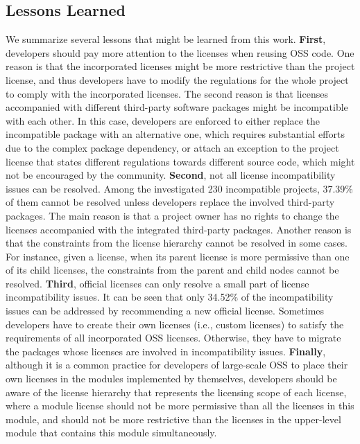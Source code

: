 \subsection{Lessons Learned}
We summarize several lessons that might be learned from this work. \textbf{First}, developers should pay more attention to the licenses when reusing OSS code. One reason is that the incorporated licenses might be more restrictive than the project license, and thus developers have to modify the regulations for the whole project to comply with the incorporated licenses. The second reason is that licenses accompanied with different third-party software packages might be incompatible with each other. In this case, developers are enforced to either replace the incompatible package with an alternative one, which requires substantial efforts due to the complex package dependency, or attach an exception to the project license that states different regulations towards different source code, which might not be encouraged by the community.
%
\textbf{Second}, not all license incompatibility issues can be resolved. Among the investigated 230 incompatible projects, {37.39\%} of them cannot be resolved unless developers replace the involved third-party packages. The main reason is that a project owner has no rights to change the licenses accompanied with the integrated third-party packages. Another reason is that the constraints from the license hierarchy cannot be resolved in some cases. For instance, given a license, when its parent license is more permissive than one of its child licenses, the constraints from the parent and child nodes cannot be resolved.
%
\textbf{Third}, official licenses can only resolve a small part of license incompatibility issues. It can be seen that only {34.52\%} of the incompatibility issues can be addressed by recommending a new official license. Sometimes developers have to create their own licenses (i.e., custom licenses) to satisfy the requirements of all incorporated OSS licenses. Otherwise, they have to migrate the packages whose licenses are involved in incompatibility issues.
%
\textbf{Finally}, although it is a common practice for developers of large-scale OSS to place their own licenses in the modules implemented by themselves, developers should be aware of the license hierarchy that represents the licensing scope of each license, where a module license should not be more permissive than all the licenses in this module, and should not be more restrictive than the licenses in the upper-level module that contains this module simultaneously.



